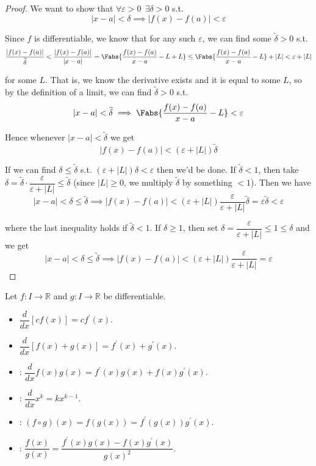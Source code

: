 \documentclass{article}
\begin{document}
\begin{proof}
  We want to show that $\forall \varepsilon > 0 ~~ \exists \delta > 0$ s.t.
  \[
    |x - a| < \delta \implies |f(x) - f(a)| < \varepsilon
  \]

  Since $f$ is differentiable, we know that for any such $\varepsilon$, we can find some $\widetilde{\delta} > 0$ s.t.
  \[
    \dfrac{|f(x) - f(a)|}{\widetilde{\delta}}
    < \dfrac{|f(x) - f(a)|}{|x - a|}
    = \Fabs{\dfrac{f(x) - f(a)}{x - a} - L + L}
    \le \Fabs{\dfrac{f(x) - f(a)}{x - a} - L} + |L|
    < \varepsilon + |L|
  \]

  for some $L$. That is, we know the derivative exists and it is equal to some $L$, so by the definition of a limit, we can find $\widetilde{\delta} > 0$ s.t.
  \[
    |x - a| < \widetilde{\delta} \implies \Fabs{\dfrac{f(x) - f(a)}{x - a} - L} < \varepsilon
  \]

  Hence whenever $|x - a| < \widetilde{\delta}$ we get
  \[
    |f(x) - f(a)| < \left(\varepsilon + |L|\right) \widetilde{\delta}
  \]

  If we can find $\delta \le \widetilde{\delta}$ s.t. $\left(\varepsilon + |L|\right)\delta < \varepsilon$ then we'd be done. If $\widetilde{\delta} < 1$, then take $\delta = \widetilde{\delta} \cdot \dfrac{\varepsilon}{\varepsilon + |L|} \le \widetilde{\delta}$ (since $|L| \ge 0$, we multiply $\widetilde{\delta}$ by something $< 1$). Then we have
  \[
    |x - a| < \delta \le \widetilde{\delta}
    \implies
    |f(x) - f(a)|
    <
    \left(\varepsilon + |L|\right) \dfrac{\varepsilon}{\varepsilon + |L|} \widetilde{\delta}
    = \varepsilon \widetilde{\delta}
    < \varepsilon
  \]

  where the last inequality holds if $\widetilde{\delta} < 1$. If $\delta \ge 1$, then set $\delta = \dfrac{\varepsilon}{\varepsilon + |L|} \le 1 \le \delta$ and we get
  \[
    |x - a| < \delta \le \widetilde{\delta}
    \implies
    |f(x) - f(a)|
    <
    \left(\varepsilon + |L|\right) \dfrac{\varepsilon}{\varepsilon + |L|}
    = \varepsilon
  \]
\end{proof}

\begin{theorem}
  Let $f: I \to \mathbb{R}$ and $g: I \to \mathbb{R}$ be differentiable.
  \begin{itemize}[label=$\bullet$]
    \item $\dfrac{d}{dx} [c f(x)] = c f^\prime(x)$.
    \item $\dfrac{d}{dx} [f(x) + g(x)] = f^\prime(x) + g^\prime(x)$.
    \item {}: $\dfrac{d}{dx} f(x) g(x) = f^\prime(x) g(x) + f(x) g^\prime(x)$.
    \item {}: $\dfrac{d}{dx} x^k = k x^{k - 1}$.
    \item {}: $(f \circ g)(x) = f(g(x)) = f^\prime(g(x)) g^\prime(x)$.
    \item {}: $\dfrac{f(x)}{g(x)} = \dfrac{f^\prime(x) g(x) - f(x) g^\prime(x)}{g(x)^2}$.
  \end{itemize}
\end{theorem}
\end{document}
